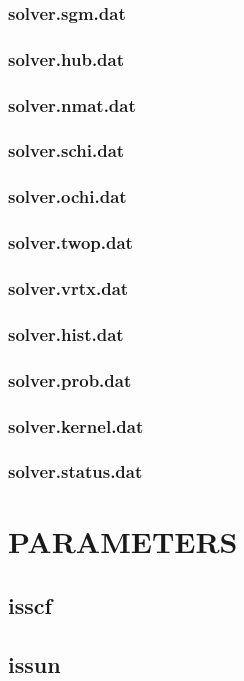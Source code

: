 \documentclass[10pt]{book}
\begin{document}
\subsection{solver.sgm.dat}
\subsection{solver.hub.dat}
\subsection{solver.nmat.dat}
\subsection{solver.schi.dat}
\subsection{solver.ochi.dat}
\subsection{solver.twop.dat}
\subsection{solver.vrtx.dat}
\subsection{solver.hist.dat}
\subsection{solver.prob.dat}
\subsection{solver.kernel.dat}
\subsection{solver.status.dat}

\chapter{PARAMETERS}
\section{isscf}
\section{issun}
\end{document}
